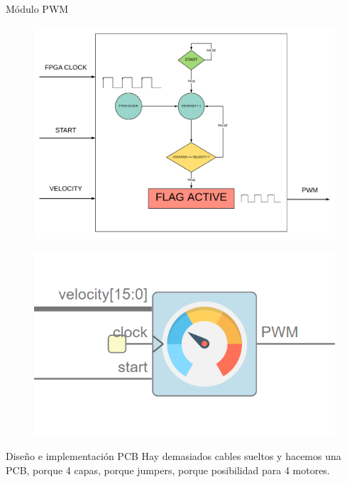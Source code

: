 \documentclass{beamer}
\begin{document}
\begin{frame}{Módulo PWM}
	\begin{figure}[H]
		\center
		\includegraphics[trim = 0mm 0mm 0mm 0mm, clip,scale=0.4]{imagenes/Balancing_robot/pwm_control.pdf}
	\end{figure}
\end{frame}

\begin{frame}
	\begin{figure}[H]
		\center
		\includegraphics[scale=0.5]{imagenes/Balancing_robot/PWM_module.PNG}
	\end{figure}
\end{frame}


\begin{frame}{Diseño e implementación PCB}
Hay demasiados cables sueltos y hacemos una PCB, porque 4 capas, porque jumpers, porque posibilidad para 4 motores.
\end{frame}
\end{document}
